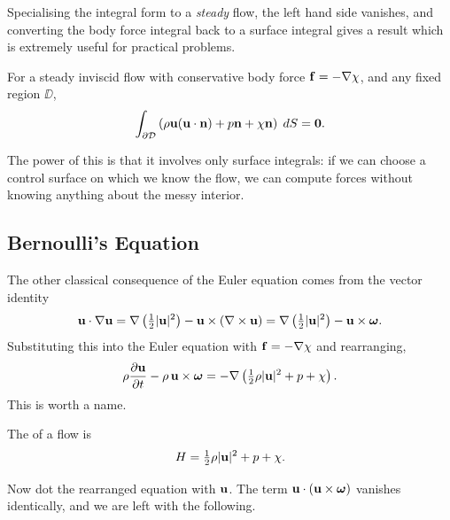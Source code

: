 \documentclass[a4paper]{scrartcl}
\newcommand{\pd}[2]{\frac{\partial #1}{\partial #2}}
\newcommand{\bom}{\boldsymbol{\omega}}
\begin{document}
Specialising the integral form to a \emph{steady} flow, the left hand side vanishes, and converting the body force integral back to a surface integral gives a result which is extremely useful for practical problems.

\begin{proposition}
	For a steady inviscid flow with conservative body force $\mathbf{f} = -\nabla \chi$, and any fixed region $\DD$,
	$$
	\int_{\partial \mathcal{D}}\left(\rho \mathbf{u} (\mathbf{u} \cdot \mathbf{n}) + p \mathbf{n} + \chi \mathbf{n}\right) \; d S = \mathbf{0}.
	$$
\end{proposition}

The power of this is that it involves only surface integrals: if we can choose a control surface on which we know the flow, we can compute forces without knowing anything about the messy interior.

\subsection{Bernoulli's Equation}

The other classical consequence of the Euler equation comes from the vector identity
$$
\vv u \cdot \nabla \vv u = \nabla \left(\tfrac{1}{2}|\vv u|^2\right) - \vv u \times (\nabla \times \vv u) = \nabla \left(\tfrac{1}{2}|\vv u|^2\right) - \vv u \times \bom.
$$
Substituting this into the Euler equation with $\mathbf{f} = -\nabla \chi$ and rearranging,
$$
\rho \pd{\vv u}{t} - \rho \, \vv u \times \bom = -\nabla\left(\tfrac{1}{2}\rho|\vv u|^2 + p + \chi \right).
$$
This is worth a name.

\begin{definition}
	The  of a flow is
	$$
	H = \tfrac{1}{2}\rho |\mathbf{u}|^2 + p + \chi.
	$$
\end{definition}

Now dot the rearranged equation with $\mathbf{u}$. The term $\vv u \cdot (\vv u \times \bom)$ vanishes identically, and we are left with the following.
\end{document}
